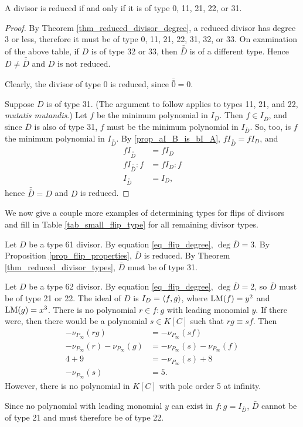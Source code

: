 \begin{theorem}
  \label{thm_reduced_divisor_types}
  A divisor is reduced if and only if it is of type 0, 11, 21, 22, or 31.
\end{theorem}
\begin{proof}
  By Theorem \ref{thm_reduced_divisor_degree},
  a reduced divisor has degree 3 or less, therefore it must be of type 0, 11, 21, 22, 31, 32, or 33.
  On examination of the above table, if $D$ is of type 32 or 33, then $\bar{\bar D}$ is of a different type.
  Hence $D \neq \bar{\bar D}$ and $D$ is not reduced.
  
  Clearly, the divisor of type 0 is reduced, since $\bar{\bar 0} = 0$.
  
  Suppose $D$ is of type 31.
  (The argument to follow applies to types 11, 21, and 22, \emph{mutatis mutandis}.)
  Let $f$ be the minimum polynomial in $I_D$.
  Then $f \in I_{\bar D}$, and since $\bar D$ is also of type 31, $f$ must be the minimum polynomial in $I_{\bar D}$.
  So, too, is $f$ the minimum polynomial in $I_{\bar{\bar D}}$.
  By \ref{prop_aI_B_is_bI_A}, $f I_{\bar{\bar D}} = f I_D$, and
  \begin{align*}
    f I_{\bar{\bar D}} &= f I_D \\
    f I_{\bar{\bar D}} : f &= f I_D : f \\
    I_{\bar{\bar D}} &= I_D,
  \end{align*}
  hence $\bar{\bar D} = D$ and $D$ is reduced.
\end{proof}

We now give a couple more examples of determining types for flips of divisors
and fill in Table \ref{tab_small_flip_type} for all remaining divisor types.

\begin{example}
  Let $D$ be a type 61 divisor.
  By equation \ref{eq_flip_degree}, $\deg \bar D = 3$.
  By Proposition \ref{prop_flip_properties}, $\bar D$ is reduced.
  By Theorem \ref{thm_reduced_divisor_types}, $\bar D$ must be of type 31.
\end{example}
\begin{example}
  Let $D$ be a type 62 divisor.
  By equation \ref{eq_flip_degree}, $\deg \bar D = 2$, so $\bar D$ must be of type 21 or 22.
  The ideal of $D$ is $I_D = \left\langle f,g \right\rangle$,
  where $\operatorname{LM}(f) = y^2$ and $\operatorname{LM}(g) = x^3$.
  There is no polynomial $r \in f : g$ with leading monomial $y$.
  If there were, then there would be a polynomial $s \in K[C]$ such that $rg \equiv sf$. Then
  \begin{align*}
    -\nu_{P_\infty}(rg) &= -\nu_{P_\infty}(sf) \\
    -\nu_{P_\infty}(r) - \nu_{P_\infty}(g) &= -\nu_{P_\infty}(s) - \nu_{P_\infty}(f) \\
    4 + 9 &= -\nu_{P_\infty}(s) + 8 \\
    -\nu_{P_\infty}(s) &= 5.
  \end{align*}
  However, there is no polynomial in $K[C]$ with pole order 5 at infinity.
  
  Since no polynomial with leading monomial $y$ can exist in $f : g = I_{\bar D}$,
  $\bar D$ cannot be of type 21 and must therefore be of type 22.
\end{example}

